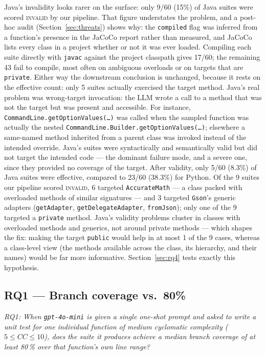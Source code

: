 Java's invalidity looks rarer on the surface: only 9/60 (15\%) of Java suites were scored
\textsc{invalid} by our pipeline. That figure understates the problem, and a post-hoc audit
(Section~\ref{sec:threats}) shows why: the \texttt{compiled} flag was inferred from a
function's presence in the JaCoCo report rather than measured, and JaCoCo lists every class
in a project whether or not it was ever loaded. Compiling each suite directly with
\texttt{javac} against the project classpath gives 17/60; the remaining 43 fail to compile,
most often on ambiguous overloads or on targets that are \texttt{private}. Either way the
downstream conclusion is unchanged, because it rests on the effective count: only 5 suites
actually exercised the target method. Java's real problem was wrong-target invocation: the LLM wrote a call to a method
that was not the target but was present and accessible. For instance,
\texttt{CommandLine.getOptionValues(\ldots)} was called when the sampled function was
actually the nested \texttt{CommandLine.Builder.getOptionValues(\ldots)}; elsewhere a
same-named method inherited from a parent class was invoked instead of the intended
override. Java's suites were syntactically and semantically valid but did not target the
intended code --- the dominant failure mode, and a severe one, since they provided no
coverage of the target. After validity, only 5/60 (8.3\%) of Java suites were effective,
compared to 23/60 (38.3\%) for Python. Of the 9 suites our pipeline scored \textsc{invalid},
6 targeted \texttt{AccurateMath} --- a class packed with overloaded methods of similar
signatures --- and 3 targeted \texttt{Gson}'s generic adapters (\texttt{getAdapter},
\texttt{getDelegateAdapter}, \texttt{fromJson}); only one of the 9 targeted a
\texttt{private} method. Java's validity problems cluster in classes with overloaded
methods and generics, not around private methods --- which shapes the fix: making the
target \texttt{public} would help in at most 1 of the 9 cases, whereas a class-level
view (the methods available across the class, its hierarchy, and their names) would be far
more informative. Section~\ref{sec:rq4} tests exactly this hypothesis.

\subsection{RQ1 --- Branch coverage vs.\ 80\%}
\emph{RQ1: When \texttt{gpt-4o-mini} is given a single one-shot prompt and asked to write a
unit test for one individual function of medium cyclomatic complexity ($5 \le CC \le 10$),
does the suite it produces achieve a median branch coverage of at least 80\,\% over that
function's own line range?}

